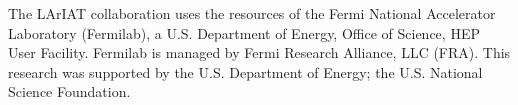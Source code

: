 The LArIAT collaboration uses the resources of the Fermi National Accelerator Laboratory (Fermilab), a U.S. Department of Energy, Office of Science, HEP User Facility. Fermilab is managed by Fermi Research Alliance, LLC (FRA).%
This research was supported by the U.S. Department of Energy; the U.S. National Science Foundation.%